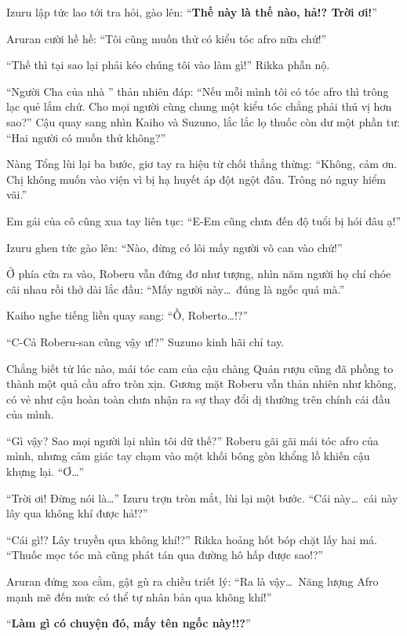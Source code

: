 \documentclass[../main.tex]{subfiles}
\begin{document}
Izuru lập tức lao tới tra hỏi, gào lên: ``\textbf{Thế này là thế nào, hả!? Trời ơi!}''

Aruran cười hề hề: ``Tôi cũng muốn thử có kiểu tóc afro nữa chứ!''

``Thế thì tại sao lại phải kéo chúng tôi vào làm gì!'' Rikka phẫn nộ.

``Người Cha của nhà \hls'' thản nhiên đáp: ``Nếu mỗi mình tôi có tóc afro thì trông lạc quẻ lắm chứ. Cho mọi người cùng chung một kiểu tóc chẳng phải thú vị hơn sao?'' Cậu quay sang nhìn Kaiho và Suzuno, lắc lắc lọ thuốc còn dư một phần tư: ``Hai người có muốn thử không?''

Nàng Tổng lùi lại ba bước, giơ tay ra hiệu từ chối thẳng thừng: ``Không, cảm ơn. Chị không muốn vào viện vì bị hạ huyết áp đột ngột đâu. Trông nó nguy hiểm vãi.''

Em gái của cô cũng xua tay liên tục: ``E-Em cũng chưa đến độ tuổi bị hói đâu ạ!''

Izuru ghen tức gào lên: ``Nào, đừng có lôi mấy người vô can vào chứ!''

Ở phía cửa ra vào, Roberu vẫn đứng đơ như tượng, nhìn năm người họ chí chóe cãi nhau rồi thở dài lắc đầu: ``Mấy người này\dots\ đúng là ngốc quá mà.''

Kaiho nghe tiếng liền quay sang: ``Ồ, Roberto\dots!?''

``C-Cả Roberu-san cũng vậy ư!?'' Suzuno kinh hãi chỉ tay.

Chẳng biết từ lúc nào, mái tóc cam của cậu chàng Quán rượu cũng đã phồng to thành một quả cầu afro tròn xịn. Gương mặt Roberu vẫn thản nhiên như không, có vẻ như cậu hoàn toàn chưa nhận ra sự thay đổi dị thường trên chính cái đầu của mình.


``Gì vậy? Sao mọi người lại nhìn tôi dữ thế?'' Roberu gãi gãi mái tóc afro của mình, nhưng cảm giác tay chạm vào một khối bông gòn khổng lồ khiến cậu khựng lại. ``Ơ\dots''

``Trời ơi! Đừng nói là\dots'' Izuru trợn tròn mắt, lùi lại một bước. ``Cái này\dots\ cái này lây qua không khí được hả!?''

``Cái gì!? Lây truyền qua không khí!?'' Rikka hoảng hốt bóp chặt lấy hai má. ``Thuốc mọc tóc mà cũng phát tán qua đường hô hấp được sao!?''

Aruran đứng xoa cằm, gật gù ra chiều triết lý: ``Ra là vậy\dots\ Năng lượng Afro mạnh mẽ đến mức có thể tự nhân bản qua không khí!''

``\textbf{Làm gì có chuyện đó, mấy tên ngốc này!!?}''
\end{document}
